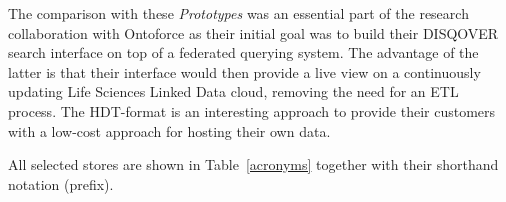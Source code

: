 The comparison with these \emph{Prototypes} was an essential part of the research collaboration with Ontoforce as their initial goal was to build their DISQOVER search interface on top of a federated querying system. The advantage of the latter is that their interface would then provide a live view on a continuously updating Life Sciences Linked Data cloud, removing the need for an ETL~\cite{ETL} process. The HDT-format is an interesting approach to provide their customers with a low-cost approach for hosting their own data.

All selected stores are shown in Table~\ref{acronyms} together with their shorthand notation (prefix).

\begin{table}[ht!]
	\centering
	\caption{List of the tested systems and their acronyms.}
	\label{acronyms}

\end{table}